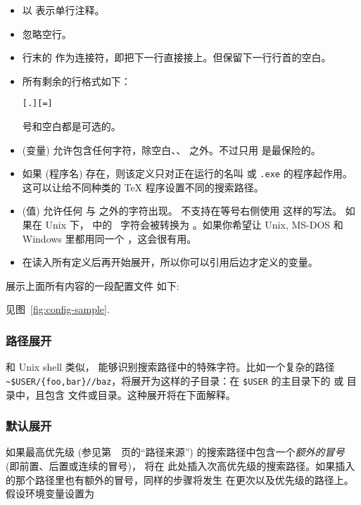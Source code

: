 \documentclass{article}
\begin{document}
\begin{itemize}
\item
  以 \code{\%} 表示单行注释。
\item
  忽略空行。
\item
  行末的 \bs{} 作为连接符，即把下一行直接接上。但保留下一行行首的空白。
\item
  所有剩余的行格式如下：
\begin{alltt}
  [.] [=] 
\end{alltt}%
 \samp{=} 号和空白都是可选的。
\item
   (变量) 允许包含任何字符，除空白、\samp{=}、
  之外。不过只用  是最保险的。
\item
  如果  (程序名) 存在，则该定义只对正在运行的名叫
  \texttt{} 或 \texttt{.exe}
  的程序起作用。这可以让给不同种类的 \TeX{} 程序设置不同的搜索路径。
\item {} (值) 允许任何 \code{\%} 与  之外的字符出现。
  不支持在等号右侧使用  这样的写法。
  如果在 Unix 下， 中的 \samp{;}\ 字符会被转换为
  \samp{:}。如果你希望让 Unix, MS-DOS 和 Windows 里都用同一个
  ，这会很有用。
\item
  在读入所有定义后再开始展开，所以你可以引用后边才定义的变量。
\end{itemize}
展示上面所有内容的一段配置文件
\ifSingleColumn
如下:


\else
见图~\ref{fig:config-sample}.
\fi

\subsubsection{路径展开}
\label{sec:path-expansion}

和 Unix shell 类似，\KPS{} 能够识别搜索路径中的特殊字符。比如一个复杂的路径
\verb+~$USER/{foo,bar}//baz+，将展开为这样的子目录：在 \texttt{\$USER}
的主目录下的  或  目录中，且包含 
文件或目录。这种展开将在下面解释。
\subsubsection{默认展开}
\label{sec:default-expansion}

如果最高优先级 (参见第~\pageref{sec:path-sources}~页的``路径来源'')
的搜索路径中包含一个\emph{额外的冒号} (即前置、后置或连续的冒号)，\KPS{} 将在
此处插入次高优先级的搜索路径。如果插入的那个路径里也有额外的冒号，同样的步骤将发生
在更次以及优先级的路径上。假设环境变量设置为
\end{document}

